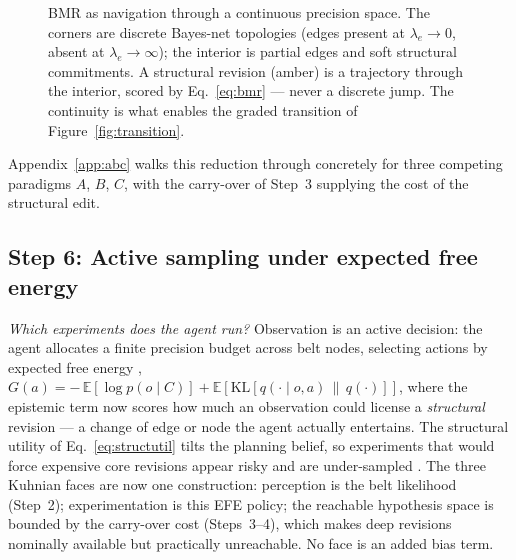 \begin{figure}[t]
\vspace{1.4cm}
\caption{BMR as navigation through a continuous precision space. The
corners are discrete Bayes-net topologies (edges present at
$\lambda_e\!\to\!0$, absent at $\lambda_e\!\to\!\infty$); the interior is
partial edges and soft structural commitments. A structural revision
(amber) is a trajectory through the interior, scored by
Eq.~\eqref{eq:bmr} --- never a discrete jump. The continuity is what
enables the graded transition of Figure~\ref{fig:transition}.}
\label{fig:bmr}
\end{figure}

\noindent Appendix~\ref{app:abc} walks this reduction through concretely
for three competing paradigms $A$, $B$, $C$, with the carry-over of
Step~3 supplying the cost of the structural edit.

\subsection{Step 6: Active sampling under expected free energy}
\label{ssec:efe}

\noindent\textit{Which experiments does the agent run?} Observation is
an active decision: the agent allocates a finite precision budget across
belt nodes, selecting actions by expected free energy
\citep{friston2015ActiveInferenceEpistemic, millidge2021EFE, Mirza2019_2},
$G(a) = -\,\mathbb{E}[\log p(o \mid C)] + \mathbb{E}[\mathrm{KL}[q(\cdot
\mid o, a)\,\|\,q(\cdot)]]$, where the epistemic term now scores how much
an observation could license a \emph{structural} revision --- a change
of edge or node the agent actually entertains. The structural utility of
Eq.~\eqref{eq:structutil} tilts the planning belief, so experiments that
would force expensive core revisions appear risky and are under-sampled
\citep{feldmanFriston2010Attention, parrFriston2017Attention, parrFriston2019AdvancedAtt, limanowskiFriston2018Dark}. The three
Kuhnian faces are now one construction: perception is the belt
likelihood (Step~2); experimentation is this EFE policy; the reachable
hypothesis space is bounded by the carry-over cost (Steps~3--4), which
makes deep revisions nominally available but practically unreachable. No
face is an added bias term.

